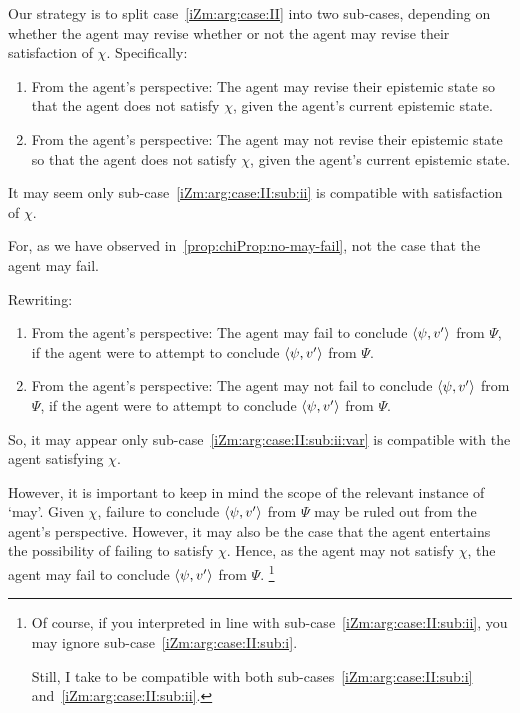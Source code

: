 \begin{note}
  Our strategy is to split case~\ref{iZm:arg:case:II} into two sub-cases, depending on whether the agent may revise whether or not the agent may revise their satisfaction of \(\chi\).
  Specifically:

  \begin{enumerate}[label=\roman*., ref=\roman*]
  \item
    \label{iZm:arg:case:II:sub:i}
    From the agent's perspective:
    The agent may revise their epistemic state so that the agent does not satisfy \(\chi\), given the agent's current epistemic state.
  \item
    \label{iZm:arg:case:II:sub:ii}
    From the agent's perspective:
    The agent may not revise their epistemic state so that the agent does not satisfy \(\chi\), given the agent's current epistemic state.
  \end{enumerate}

  It may seem only sub-case~\ref{iZm:arg:case:II:sub:ii} is compatible with satisfaction of \(\chi\).

  For, as we have observed in~\autoref{prop:chiProp:no-may-fail}, not the case that the agent may fail.

  Rewriting:

  \begin{enumerate}[label=\roman*\('\)., ref=\roman*\('\)]
  \item
    \label{iZm:arg:case:II:sub:i:var}
    From the agent's perspective:
    The agent may fail to conclude \(\langle \psi, v' \rangle\) from \(\Psi\), if the agent were to attempt to conclude \(\langle \psi, v' \rangle\) from \(\Psi\).
  \item
    \label{iZm:arg:case:II:sub:ii:var}
    From the agent's perspective:
    The agent may not fail to conclude \(\langle \psi, v' \rangle\) from \(\Psi\), if the agent were to attempt to conclude \(\langle \psi, v' \rangle\) from \(\Psi\).
  \end{enumerate}

  So, it may appear only sub-case~\ref{iZm:arg:case:II:sub:ii:var} is compatible with the agent satisfying \(\chi\).

  However, it is important to keep in mind the scope of the relevant instance of `may'.
  Given \(\chi\), failure to conclude \(\langle \psi, v' \rangle\) from \(\Psi\) may be ruled out from the agent's perspective.
  However, it may also be the case that the agent entertains the possibility of failing to satisfy \(\chi\).
  Hence, as the agent may not satisfy \(\chi\), the agent may fail to conclude \(\langle \psi, v' \rangle\) from \(\Psi\).%
  \footnote{
    Of course, if you interpreted \qzS{} in line with sub-case~\ref{iZm:arg:case:II:sub:ii}, you may ignore sub-case~\ref{iZm:arg:case:II:sub:i}.

    Still, I take \qzS{} to be compatible with both sub-cases~\ref{iZm:arg:case:II:sub:i} and~\ref{iZm:arg:case:II:sub:ii}.
  }
\end{note}

